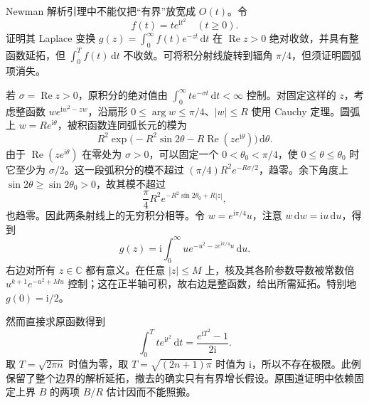 \begin{optionalexercise}\label{b3:ex:27-7}
Newman 解析引理中不能仅把“有界”放宽成 \(O(t)\)。令
\[
 f(t)=t e^{\mathrm it^2}\quad(t\ge0).
\]
证明其 Laplace 变换 \(g(z)=\int_0^\infty f(t)e^{-zt}\,\mathrm dt\) 在 \(\operatorname{Re}z>0\) 绝对收敛，并具有整函数延拓，但 \(\int_0^T f(t)\,\mathrm dt\) 不收敛。可将积分射线旋转到辐角 \(\pi/4\)，但须证明圆弧项消失。
\end{optionalexercise}
\begin{solution}
若 \(\sigma=\operatorname{Re}z>0\)，原积分的绝对值由
\(\int_0^\infty t e^{-\sigma t}\,\mathrm dt<\infty\) 控制。对固定这样的 \(z\)，考虑整函数
\(w e^{\mathrm iw^2-zw}\)，沿扇形 \(0\le\arg w\le\pi/4\)、\(|w|\le R\) 使用 Cauchy 定理。圆弧上 \(w=Re^{\mathrm i\theta}\)，被积函数连同弧长元的模为
\[
 R^2\exp\!\bigl(-R^2\sin2\theta
               -R\operatorname{Re}(ze^{\mathrm i\theta})\bigr)\,\mathrm d\theta.
\]
由于 \(\operatorname{Re}(ze^{\mathrm i\theta})\) 在零处为 \(\sigma>0\)，可以固定一个 \(0<\theta_0<\pi/4\)，使 \(0\le\theta\le\theta_0\) 时它至少为 \(\sigma/2\)。这一段弧积分的模不超过
\((\pi/4)R^2e^{-R\sigma/2}\)，趋零。余下角度上
\(\sin2\theta\ge\sin2\theta_0>0\)，故其模不超过
\[
 \frac\pi4R^2e^{-R^2\sin2\theta_0+R|z|},
\]
也趋零。因此两条射线上的无穷积分相等。令 \(w=e^{\mathrm i\pi/4}u\)，注意 \(w\,\mathrm dw=\mathrm i u\,\mathrm du\)，得到
\[
 g(z)=\mathrm i\int_0^\infty
             u e^{-u^2-z e^{\mathrm i\pi/4}u}\,\mathrm du.
\]
右边对所有 \(z\in\mathbb C\) 都有意义。在任意 \(|z|\le M\) 上，核及其各阶参数导数被常数倍
\(u^{k+1}e^{-u^2+Mu}\) 控制；这在正半轴可积，故右边是整函数，给出所需延拓。特别地 \(g(0)=\mathrm i/2\)。

然而直接求原函数得到
\[
 \int_0^T t e^{\mathrm it^2}\,\mathrm dt
       =\frac{e^{\mathrm iT^2}-1}{2\mathrm i}.
\]
取 \(T=\sqrt{2\pi n}\) 时值为零，取 \(T=\sqrt{(2n+1)\pi}\) 时值为 \(\mathrm i\)，所以不存在极限。此例保留了整个边界的解析延拓，撤去的确实只有有界增长假设。原围道证明中依赖固定上界 \(B\) 的两项 \(B/R\) 估计因而不能照搬。
\end{solution}

